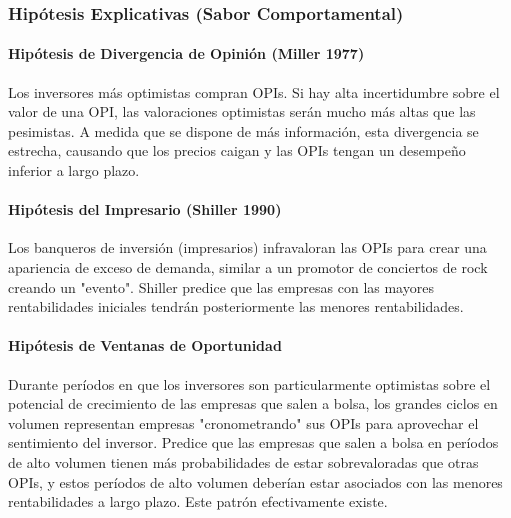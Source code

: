 \subsubsection{Hipótesis Explicativas (Sabor Comportamental)}

\paragraph{Hipótesis de Divergencia de Opinión (Miller 1977)}

\begin{teorema}
Los inversores más optimistas compran OPIs. Si hay alta incertidumbre sobre el valor de una OPI, las valoraciones optimistas serán mucho más altas que las pesimistas. A medida que se dispone de más información, esta divergencia se estrecha, causando que los precios caigan y las OPIs tengan un desempeño inferior a largo plazo.
\end{teorema}

\paragraph{Hipótesis del Impresario (Shiller 1990)}

\begin{teorema}
Los banqueros de inversión (impresarios) infravaloran las OPIs para crear una apariencia de exceso de demanda, similar a un promotor de conciertos de rock creando un "evento". Shiller predice que las empresas con las mayores rentabilidades iniciales tendrán posteriormente las menores rentabilidades.
\end{teorema}

\paragraph{Hipótesis de Ventanas de Oportunidad}

\begin{teorema}
Durante períodos en que los inversores son particularmente optimistas sobre el potencial de crecimiento de las empresas que salen a bolsa, los grandes ciclos en volumen representan empresas "cronometrando" sus OPIs para aprovechar el sentimiento del inversor. Predice que las empresas que salen a bolsa en períodos de alto volumen tienen más probabilidades de estar sobrevaloradas que otras OPIs, y estos períodos de alto volumen deberían estar asociados con las menores rentabilidades a largo plazo. Este patrón efectivamente existe.
\end{teorema}

